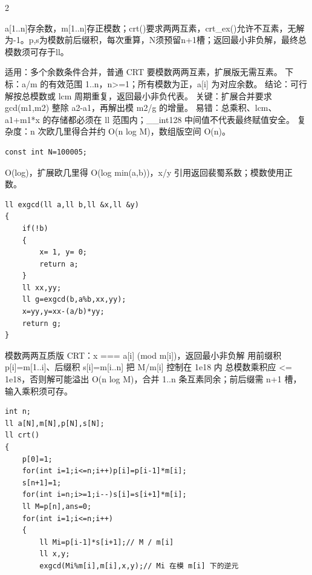 \documentclass[UTF8,fontset=fandol,a4paper,twoside]{ctexart}
\newcommand{\note}[1]{{\fontsize{10}{12}\selectfont #1\par}}
\begin{document}
\begin{multicols}{2}
\note{a[\allowbreak{}1.\allowbreak{}.\allowbreak{}n]\allowbreak{}存余数，m[\allowbreak{}1.\allowbreak{}.\allowbreak{}n]\allowbreak{}存正模数；crt(\allowbreak{})\allowbreak{}要求两两互素，crt\_ex(\allowbreak{})\allowbreak{}允许不互素，无解为-\allowbreak{}1。p,\allowbreak{}s为模数前后缀积，每次重算，N须预留n+\allowbreak{}1槽；返回最小非负解，最终总模数须可存于ll。}
\note{适用：多个余数条件合并，普通 CRT 要模数两两互素，扩展版无需互素。 下标：a/\allowbreak{}m 的有效范围 1.\allowbreak{}.\allowbreak{}n，n>\allowbreak{}=\allowbreak{}1；所有模数为正，a[\allowbreak{}i]\allowbreak{} 为对应余数。 结论：可行解按总模数或 lcm 周期重复，返回最小非负代表。 关键：扩展合并要求 gcd(\allowbreak{}m1,\allowbreak{}m2)\allowbreak{} 整除 a2-\allowbreak{}a1，再解出模 m2/\allowbreak{}g 的增量。 易错：总乘积、lcm、a1+\allowbreak{}m1*x 的存储都必须在 ll 范围内；\_\_int128 中间值不代表最终赋值安全。 复杂度：n 次欧几里得合并约 O(\allowbreak{}n log M)\allowbreak{}，数组版空间 O(\allowbreak{}n)\allowbreak{}。}
\begin{lstlisting}
const int N=100005;
\end{lstlisting}
\note{O(\allowbreak{}log)\allowbreak{}，扩展欧几里得 O(\allowbreak{}log min(\allowbreak{}a,\allowbreak{}b)\allowbreak{})\allowbreak{}，x/\allowbreak{}y 引用返回裴蜀系数；模数使用正数。}
\begin{lstlisting}
ll exgcd(ll a,ll b,ll &x,ll &y)
{
    if(!b)
    {
        x= 1, y= 0;
        return a;
    }
    ll xx,yy;
    ll g=exgcd(b,a%b,xx,yy);
    x=yy,y=xx-(a/b)*yy;
    return g;
}
\end{lstlisting}
\note{模数两两互质版 CRT：x =\allowbreak{}=\allowbreak{}=\allowbreak{} a[\allowbreak{}i]\allowbreak{} (\allowbreak{}mod m[\allowbreak{}i]\allowbreak{})\allowbreak{}，返回最小非负解 用前缀积 p[\allowbreak{}i]\allowbreak{}=\allowbreak{}m[\allowbreak{}1.\allowbreak{}.\allowbreak{}i]\allowbreak{}、后缀积 s[\allowbreak{}i]\allowbreak{}=\allowbreak{}m[\allowbreak{}i.\allowbreak{}.\allowbreak{}n]\allowbreak{} 把 M/\allowbreak{}m[\allowbreak{}i]\allowbreak{} 控制在 1e18 内 总模数乘积应 <\allowbreak{}=\allowbreak{} 1e18，否则解可能溢出 O(\allowbreak{}n log M)\allowbreak{}，合并 1.\allowbreak{}.\allowbreak{}n 条互素同余；前后缀需 n+\allowbreak{}1 槽，输入乘积须可存。}
\begin{lstlisting}
int n;
ll a[N],m[N],p[N],s[N];
ll crt()
{
    p[0]=1;
    for(int i=1;i<=n;i++)p[i]=p[i-1]*m[i];
    s[n+1]=1;
    for(int i=n;i>=1;i--)s[i]=s[i+1]*m[i];
    ll M=p[n],ans=0;
    for(int i=1;i<=n;i++)
    {
        ll Mi=p[i-1]*s[i+1];// M / m[i]
        ll x,y;
        exgcd(Mi%m[i],m[i],x,y);// Mi 在模 m[i] 下的逆元

\end{lstlisting}
\end{multicols}
\end{document}
